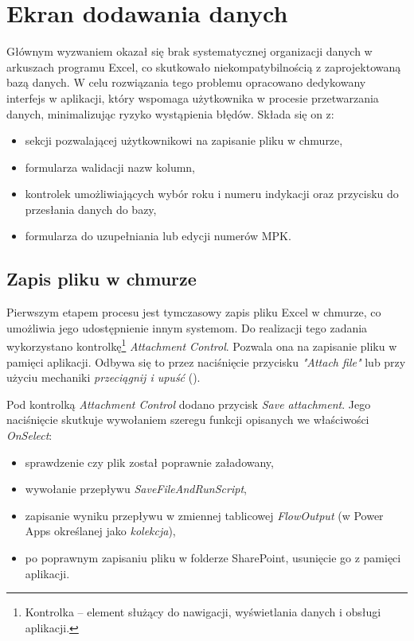 \section{Ekran dodawania danych}

Głównym wyzwaniem okazał się brak systematycznej organizacji danych w arkuszach programu
Excel, co skutkowało niekompatybilnością z zaprojektowaną bazą danych. W celu rozwiązania tego
problemu opracowano dedykowany interfejs w aplikacji, który wspomaga użytkownika w procesie
przetwarzania danych, minimalizując ryzyko wystąpienia błędów. Składa się on z:
\begin{itemize}
    \item sekcji pozwalającej użytkownikowi na zapisanie pliku w chmurze,
    \item formularza walidacji nazw kolumn,
    \item kontrolek umożliwiających wybór roku i numeru indykacji oraz przycisku do przesłania danych do bazy,
    \item formularza do uzupełniania lub edycji numerów MPK.
\end{itemize}


\subsection{Zapis pliku w chmurze}
Pierwszym etapem procesu jest tymczasowy zapis pliku Excel w chmurze, co umożliwia jego udostępnienie innym systemom. Do realizacji tego zadania wykorzystano kontrolkę\footnote{Kontrolka -- element służący do nawigacji, wyświetlania danych i obsługi aplikacji.} \emph{Attachment Control}. Pozwala ona na zapisanie pliku w pamięci aplikacji. Odbywa się to przez naciśnięcie przycisku \emph{"Attach file"} lub przy użyciu mechaniki \emph{przeciągnij i upuść} ().

Pod kontrolką \emph{Attachment Control} dodano przycisk \emph{Save attachment}. Jego naciśnięcie skutkuje wywołaniem szeregu funkcji opisanych we właściwości \emph{OnSelect}:
\begin{itemize}
    \item sprawdzenie czy plik został poprawnie załadowany,
    \item wywołanie przepływu \emph{SaveFileAndRunScript},
    \item zapisanie wyniku przepływu w zmiennej tablicowej \emph{FlowOutput} (w Power Apps określanej jako \emph{kolekcja}),
    \item po poprawnym zapisaniu pliku w folderze SharePoint, usunięcie go z pamięci aplikacji.
\end{itemize}

